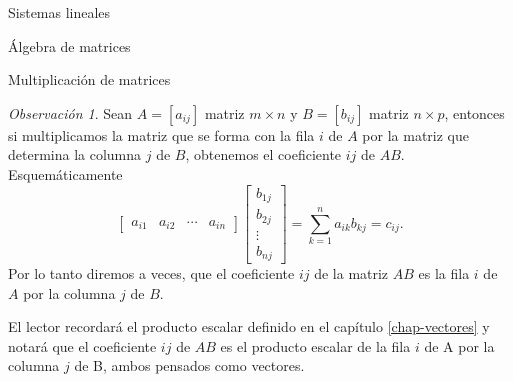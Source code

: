 \documentclass[a4paper,12pt,twoside,spanish,reqno]{amsbook}
\numberwithin{equation}{section}
\theoremstyle{definition}
\theoremstyle{remark}
\newtheorem{obs}[teorema]{Observaci\'on}
\begin{document}
\begin{chapter}{Sistemas lineales}
\begin{section}{Álgebra de matrices}
\begin{subsection}{Multiplicación de matrices}
                
                \begin{obs}\label{mtrx-filasxcols}
                     Sean $A=[a_{ij}]$ matriz $m \times n$ y $B=[b_{ij}]$ matriz $n \times p$, entonces si 
                     multiplicamos la matriz que se forma con la fila $i$ de $A$ por la matriz que determina la columna $j$ de $B$, obtenemos el coeficiente $ij$ de $AB$.
                    Esquemáticamente
                    \begin{equation*}
                    \begin{bmatrix} a_{i1}& a_{i2}& \cdots &a_{in}\end{bmatrix}
                    \begin{bmatrix} b_{1j}\\ b_{2j}\\ \vdots \\b_{nj}\end{bmatrix} =  \sum_{k=1}^{n}a_{ik}b_{kj} = c_{ij}.
                    \end{equation*}
                    Por lo tanto diremos a veces, que el coeficiente $ij$ de la matriz $AB$ es la fila $i$ de $A$ por la columna $j$ de $B$. 
                    
                    El lector recordará el producto escalar definido en  el capítulo \ref{chap-vectores} y notará que el coeficiente $ij$ de $AB$ es el producto escalar de la fila $i$ de A por la columna $j$ de B, ambos pensados como vectores. 
                \end{obs}	
                

\end{subsection}
\end{section}
\end{chapter}
\end{document}
